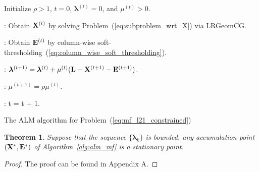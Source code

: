 \documentclass[letterpaper]{article}
\newtheorem{theorem}{Theorem}
\def\bE{{\bf E}}
\def\blambda{{\bm \lambda}}
\def\bL{{\bf L}}
\def\bX{{\bf X}}
\def\bX{{\bf X}}
\begin{document}
\begin{algorithm}[h!]
\begin{algorithmic}
\STATE Initialize $\rho > 1$, $t = 0$, $\blambda^{(t)} = 0$, and $\mu^{(t)} > 0$.



    : Obtain $\bX^{(t)}$ by solving Problem~(\ref{eq:subproblem_wrt_X}) via LRGeomCG.

    : Obtain $\bE^{(t)}$ by column-wise soft-thresholding~(\ref{eq:column_wise_soft_thresholding}).

  \ENDWHILE

  : $\blambda^{(t+1)} = \blambda^{(t)} + \mu^{(t)} (\bL - \bX^{(t+1)} - \bE^{(t+1)})$.

  : $\mu^{(t+1)} = \rho \mu^{(t)}$.

  : t = t + 1.

\ENDWHILE

\end{algorithmic}
\caption{The ALM algorithm for Problem~(\ref{eq:mf_l21_constrained})}
\label{alg:alm_mf}
\end{algorithm}



\begin{theorem}
\label{theorem:alm_convergence}
  Suppose that the sequence $\{ \blambda_{k} \}$ is bounded, any accumulation point $(\bX^*, \bE^*)$ of Algorithm~\ref{alg:alm_mf} is a stationary point.
\end{theorem}

\begin{proof}
\label{proof:proof_AA}
  The proof can be found in Appendix A.
\end{proof}
\end{document}
